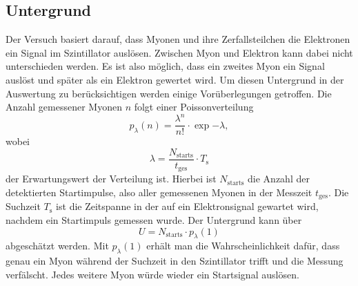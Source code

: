 \subsection{Untergrund}
\label{ssec:untergrund}

Der Versuch basiert darauf, dass Myonen und ihre Zerfallsteilchen die Elektronen ein Signal im Szintillator auslösen.
Zwischen Myon und Elektron kann dabei nicht unterschieden werden.
Es ist also möglich, dass ein zweites Myon ein Signal auslöst und später als ein Elektron gewertet wird.
Um diesen Untergrund in der Auswertung zu berücksichtigen werden einige Vorüberlegungen getroffen.
Die Anzahl gemessener Myonen $n$ folgt einer Poissonverteilung
\begin{equation}
    p_\lambda (n) = \frac{\lambda ^n}{n !} \cdot \exp{- \lambda},
\end{equation}
wobei
\begin{equation}
    \lambda = \frac{N_\text{starts}}{t_\text{ges}} \cdot T_\text{s}
\end{equation}
der Erwartungswert der Verteilung ist.
Hierbei ist $N_\text{starts}$ die Anzahl der detektierten Startimpulse, also aller gemessenen Myonen in der Messzeit $t_\text{ges}$.
Die Suchzeit $T_\text{s}$ ist die Zeitspanne in der auf ein Elektronsignal gewartet wird, nachdem ein Startimpuls gemessen wurde.
Der Untergrund kann über 
\begin{equation}
    U = N_\text{starts} \cdot p_\lambda (1)
    \label{eqn:poisson_untergrund}
\end{equation}
abgeschätzt werden.
Mit $p_\lambda (1)$ erhält man die Wahrscheinlichkeit dafür, dass genau ein Myon während der Suchzeit in den Szintillator trifft und die Messung verfälscht.
Jedes weitere Myon würde wieder ein Startsignal auslösen.